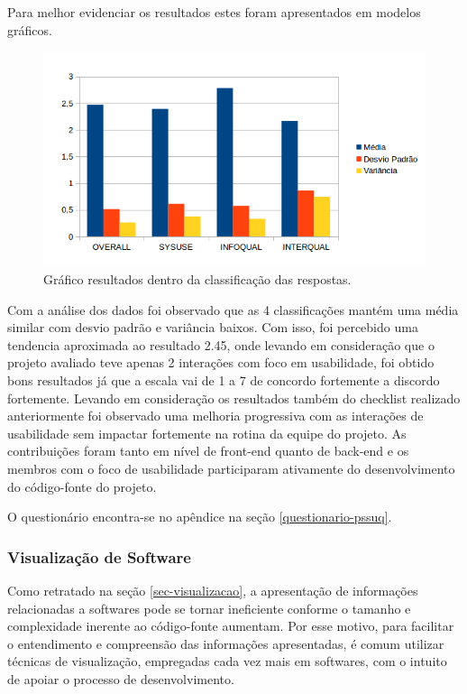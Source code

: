 Para melhor evidenciar os resultados estes foram apresentados em modelos gráficos.

\graphicspath{{figuras/}}
\begin{figure}[h]
\centering
\includegraphics[width=1.0\textwidth]{GraficoResultados}
\caption{Gráfico resultados dentro da classificação das respostas.}
\label{parallel-coordinate}
\end{figure}

Com a análise dos dados foi observado que as 4 classificações mantém uma média similar com desvio padrão e variância baixos. Com isso, foi percebido uma tendencia aproximada ao resultado 2.45, onde levando em consideração que o projeto avaliado teve apenas 2 interações com foco em usabilidade, foi obtido bons resultados já que a escala vai de 1 a 7 de concordo fortemente a discordo fortemente. Levando em consideração os resultados também do checklist realizado anteriormente foi observado uma melhoria progressiva com as interações de usabilidade sem impactar fortemente na rotina da equipe do projeto. As contribuições foram tanto em nível de front-end quanto de back-end e os membros com o foco de usabilidade participaram ativamente do desenvolvimento do código-fonte do projeto. 

O questionário encontra-se no apêndice na seção \ref{questionario-pssuq}.

%
\subsubsection{Visualização de Software}
\label{visualizacao-software}

Como retratado na seção \ref{sec-visualizacao}, a apresentação de informações relacionadas a softwares pode se tornar ineficiente conforme o tamanho e complexidade inerente ao código-fonte aumentam. Por esse motivo, para facilitar o entendimento e compreensão das informações apresentadas, é comum utilizar técnicas de visualização, empregadas cada vez mais em softwares, com o intuito de apoiar o processo de desenvolvimento.

